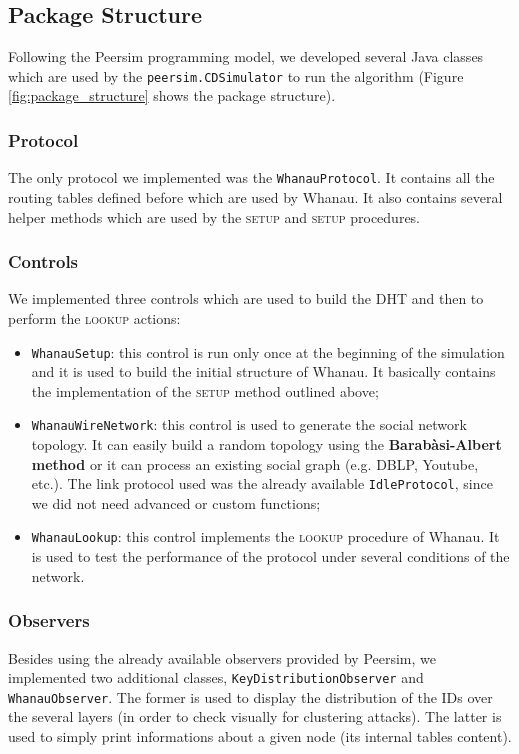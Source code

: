 \subsection{Package Structure}
Following the Peersim programming model, we developed several Java classes which are used by the \texttt{peersim.CDSimulator} to run the algorithm (Figure \ref{fig:package_structure} shows the package structure).

\subsubsection{Protocol} The only protocol we implemented was the \texttt{WhanauProtocol}. It contains all the routing tables defined before which are used by Whanau. It also contains several helper methods which are used by the \textsc{setup} and \textsc{setup} procedures.

\subsubsection{Controls} We implemented three controls which are used to build the DHT and then to perform the \textsc{lookup} actions:
\begin{itemize}
    \item \texttt{WhanauSetup}: this control is run only once at the beginning of the simulation and it is used to build the initial structure of Whanau. It basically contains the implementation of the \textsc{setup} method outlined above;
    \item \texttt{WhanauWireNetwork}: this control is used to generate the social network topology. It can easily build a random topology using the \textbf{Barabàsi-Albert method} \cite{barabasi1999emergence} or it can process an existing social graph (e.g. DBLP, Youtube, etc.).
    The link protocol used was the already available \texttt{IdleProtocol}, since we did not need advanced or custom functions;
    \item \texttt{WhanauLookup}: this control implements the \textsc{lookup} procedure of Whanau. It is used to test the performance of the protocol under several conditions of the network.
\end{itemize}

\subsubsection{Observers} Besides using the already available observers provided by Peersim, we implemented two additional classes, \texttt{KeyDistributionObserver} and \texttt{WhanauObserver}. The former is used to display the distribution of the IDs over the several layers (in order to check visually for clustering attacks). The latter is used to simply print informations about a given node (its internal tables content).

